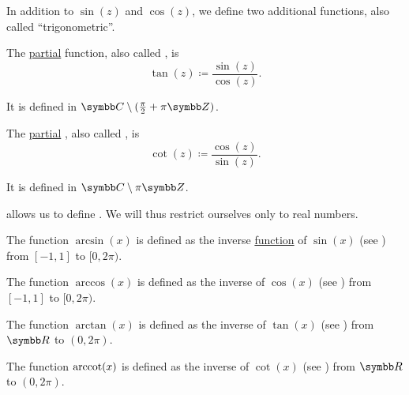 \begin{definition}\label{def:derived_trigonometric_functions}
  In addition to \( \sin(z) \) and \( \cos(z) \), we define two additional functions, also called \enquote{trigonometric}.

  \begin{defenum}
     The \hyperref[def:function/partial]{partial}  function, also called , is
    \begin{equation*}
      \tan(z) \coloneqq \frac {\sin(z)} {\cos(z)}.
    \end{equation*}

    It is defined in \( \BC \setminus (\tfrac \pi 2 + \pi\BZ) \).

     The \hyperref[def:function/partial]{partial} , also called , is
    \begin{equation*}
      \cot(z) \coloneqq \frac {\cos(z)} {\sin(z)}.
    \end{equation*}

    It is defined in \( \BC \setminus \pi\BZ \).
  \end{defenum}
\end{definition}

\begin{definition}\label{def:inverse_trigonometric_functions}
   allows us to define . We will thus restrict ourselves only to real numbers.

  \begin{defenum}
     The  function \( \arcsin(x) \) is defined as the inverse \hyperref[def:function/inverse]{function} of \( \sin(x) \) (see ) from \( [-1, 1] \) to \( [0, 2\pi) \).

     The  function \( \arccos(x) \) is defined as the inverse of \( \cos(x) \) (see ) from \( [-1, 1] \) to \( [0, 2\pi) \).

     The  function \( \arctan(x) \) is defined as the inverse of \( \tan(x) \) (see ) from \( \BR \) to \( (0, 2\pi) \).

     The  function \( \operatorname{arccot}(x) \) is defined as the inverse of \( \cot(x) \) (see ) from \( \BR \) to \( (0, 2\pi) \).
  \end{defenum}
\end{definition}
